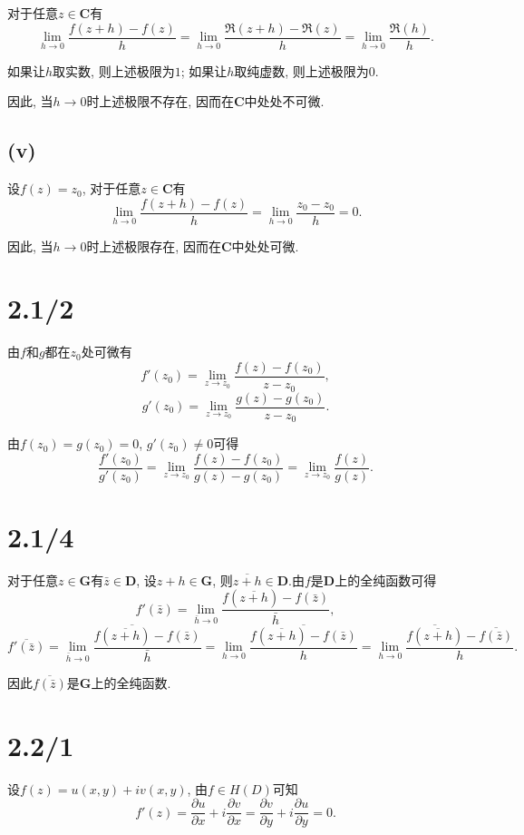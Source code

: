 \documentclass{article}
\begin{document}
对于任意$z\in\mathbf{C}$有
$$\lim_{h\to0}\frac{f(z+h)-f(z)}{h}=\lim_{h\to0}\frac{\Re(z+h)-\Re(z)}{h}=\lim_{h\to0}\frac{\Re(h)}{h}.$$

如果让$h$取实数, 则上述极限为$1$; 如果让$h$取纯虚数, 则上述极限为$0$.

因此, 当$h\to0$时上述极限不存在, 因而在$\mathbf{C}$中处处不可微.

\subsection*{(v)}

设$f(z)=z_0$, 对于任意$z\in\mathbf{C}$有
$$\lim_{h\to0}\frac{f(z+h)-f(z)}{h}=\lim_{h\to0}\frac{z_0-z_0}{h}=0.$$

因此, 当$h\to0$时上述极限存在, 因而在$\mathbf{C}$中处处可微.

\section{2.1/2}

由$f$和$g$都在$z_0$处可微有
$$f'(z_0)=\lim_{z\to z_0}\frac{f(z)-f(z_0)}{z-z_0},$$
$$g'(z_0)=\lim_{z\to z_0}\frac{g(z)-g(z_0)}{z-z_0}.$$

由$f(z_0)=g(z_0)=0$, $g'(z_0)\neq 0$可得
$$\frac{f'(z_0)}{g'(z_0)}=\lim_{z\to z_0}\frac{f(z)-f(z_0)}{g(z)-g(z_0)}=\lim_{z\to z_0}\frac{f(z)}{g(z)}.$$

\section{2.1/4}

对于任意$z\in\mathbf{G}$有$\bar{z}\in\mathbf{D}$, 设$z+h\in\mathbf{G}$, 则$\overline{z+h}\in\mathbf{D}$.由$f$是$\mathbf{D}$上的全纯函数可得
$$f'(\bar{z})=\lim_{\bar{h}\to0}\frac{f({\overline{z+h}})-f(\bar{z})}{\bar{h}},$$
$$\overline{f'(\bar{z})}=\overline{\lim_{\bar{h}\to0}\frac{f({\overline{z+h}})-f(\bar{z})}{\bar{h}}}=\lim_{h\to0}\frac{\overline{f(\overline{z+h})-f(\bar{z})}}{h}=\lim_{h\to0}\frac{\overline{f({\overline{z+h}})}-\overline{f(\bar{z})}}{h}.$$

因此$\overline{f(\bar{z})}$是$\mathbf{G}$上的全纯函数.

\section{2.2/1}

设$f(z)=u(x,y)+iv(x,y)$, 由$f\in H(D)$可知
$$f'(z)=\frac{\partial u}{\partial x}+i\frac{\partial v}{\partial x}=\frac{\partial v}{\partial y}+i\frac{\partial u}{\partial y}=0.$$
\end{document}

